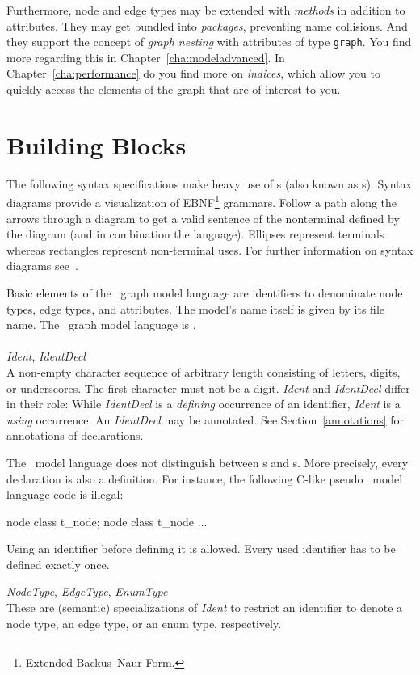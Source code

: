 Furthermore, node and edge types may be extended with \emph{methods} in addition to attributes.
They may get bundled into \emph{packages}, preventing name collisions.
And they support the concept of \emph{graph nesting} with attributes of type \texttt{graph}.
You find more regarding this in Chapter~\ref{cha:modeladvanced}.
In Chapter~\ref{cha:performance} do you find more on \emph{indices}, which allow you to quickly access the elements of the graph that are of interest to you.

\section{Building Blocks}
\label{modelbb}

\begin{note}
The following syntax specifications make heavy use of s (also known as s).
Syntax diagrams provide a visualization of EBNF\footnote{Extended Backus–Naur Form.} grammars.
Follow a path along the arrows through a diagram to get a valid sentence of the nonterminal defined by the diagram (and in combination the language).
Ellipses represent terminals whereas rectangles represent non-terminal uses.
For further information on syntax diagrams see~\cite{MMJW:91}.
\end{note}
Basic elements of the \GrG\ graph model language are identifiers to denominate node types, edge types, and attributes.
The model's name itself is given by its file name.
The \GrG\ graph model language is .\\
\\
\emph{Ident}, \emph{IdentDecl}\\ \nopagebreak
A non-empty character sequence of arbitrary length consisting of letters, digits, or underscores.
The first character must not be a digit. \emph{Ident} and \emph{IdentDecl} differ in their role:
While \emph{IdentDecl} is a \emph{defining} occurrence of an identifier, \emph{Ident} is a \emph{using} occurrence.
An \emph{IdentDecl} may be annotated. See Section~\ref{annotations} for annotations of declarations.
\begin{note}
\label{note:modeldecl}
  The \GrG\ model language does not distinguish between s and s. More precisely, every declaration is also a definition. For instance, the following C-like pseudo \GrG\ model language code is illegal:
\begin{grgen}
node class t_node;
node class t_node {
  ...
}
\end{grgen}
Using an identifier before defining it is allowed. Every used identifier has to be defined exactly once.
\end{note}
\emph{NodeType}, \emph{EdgeType}, \emph{EnumType}\\ %
These are (semantic) specializations of \emph{Ident} to restrict an identifier to denote a node type, an edge type, or an enum type, respectively.

